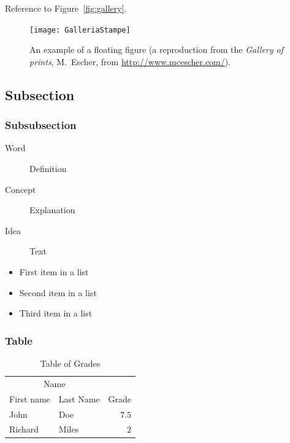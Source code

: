 \documentclass[
10pt, %
a4paper, %
oneside, %
headinclude,footinclude, %
BCOR5mm, %
]{scrartcl}
\begin{document}
Reference to Figure~\vref{fig:gallery}. %

\begin{figure}[tb]
\centering 
\texttt{[image: GalleriaStampe]} 
\caption[An example of a floating figure]{An example of a floating figure (a reproduction from the \emph{Gallery of prints}, M.~Escher, from \url{http://www.mcescher.com/}).} %
\label{fig:gallery} 
\end{figure}

\lipsum[10] %


\subsection{Subsection}
\lipsum[11] %

\subsubsection{Subsubsection}

\lipsum[12] %

\begin{description}
\item[Word] Definition
\item[Concept] Explanation
\item[Idea] Text
\end{description}

\lipsum[12] %

\begin{itemize}[noitemsep] %
\item First item in a list
\item Second item in a list
\item Third item in a list
\end{itemize}

\subsubsection{Table}

\lipsum[13] %

\begin{table}[hbt]
\caption{Table of Grades}
\centering
\begin{tabular}{llr}
\toprule
\multicolumn{2}{c}{Name} \\
\cmidrule(r){1-2}
First name & Last Name & Grade \\
\midrule
John & Doe & $7.5$ \\
Richard & Miles & $2$ \\
\bottomrule
\end{tabular}
\label{tab:label}
\end{table}
\end{document}
